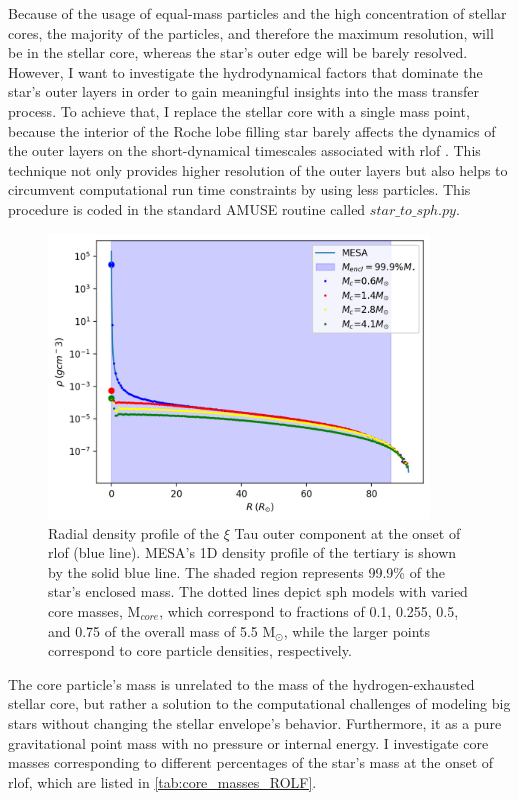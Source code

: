 Because of the usage of equal-mass particles and the high concentration of stellar cores, the majority of the particles, and therefore the maximum resolution, will be in the stellar core, whereas the star's outer edge will be barely resolved. However, I want to investigate the hydrodynamical factors that dominate the star's outer layers in order to gain meaningful insights into the mass transfer process. To achieve that, I replace the stellar core with a single mass point, because the interior of the Roche lobe filling star barely affects the dynamics of the outer layers on the short-dynamical timescales associated with \ac{rlof} \citep{deupree2005structure}. This technique not only provides higher resolution of the outer layers but also helps to circumvent computational run time constraints by using less particles. This procedure is coded in the standard AMUSE routine called $star\_to\_sph.py$.
\begin{figure}[H]
    \centering
    \includegraphics[width=0.9\textwidth]{Thesis/graphs/ROLF_density_profile.pdf}
    \caption{Radial density profile of the  $\xi$ Tau outer component at the onset of \ac{rlof} (blue line). MESA's 1D density profile of the tertiary is shown by the solid blue line. The shaded region represents 99.9\% of the star's enclosed mass. The dotted lines depict \ac{sph} models with varied core masses, M$_{core}$, which correspond to fractions of 0.1, 0.255, 0.5, and 0.75 of the overall mass of 5.5 M$_{\odot}$, while the larger points correspond to core particle densities, respectively.}
    \label{fig:stellar_density_ROLF}
\end{figure}
The core particle's mass is unrelated to the mass of the hydrogen-exhausted stellar core, but rather a solution to the computational challenges of modeling big stars without changing the stellar envelope's behavior. Furthermore, it as a pure gravitational point mass with no pressure or internal energy. I investigate core masses corresponding to different percentages of the star's mass at the onset of \ac{rlof}, which are listed in \cref{tab:core_masses_ROLF}. 
